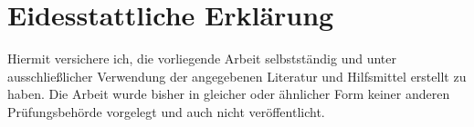 \newpage
\section*{Eidesstattliche Erklärung}
\thispagestyle{empty}

Hiermit versichere ich, die vorliegende Arbeit selbstständig und unter ausschließlicher Verwendung der angegebenen Literatur und Hilfsmittel erstellt zu haben.
Die Arbeit wurde bisher in gleicher oder ähnlicher Form keiner anderen Prüfungsbehörde vorgelegt und auch nicht veröffentlicht.
\vspace{1cm}
\signature{\residence}{\authorName}
\ifsecondauthor
    \vspace{2cm}
    \signature{\secondresidence}{\secondAuthorName}
\fi